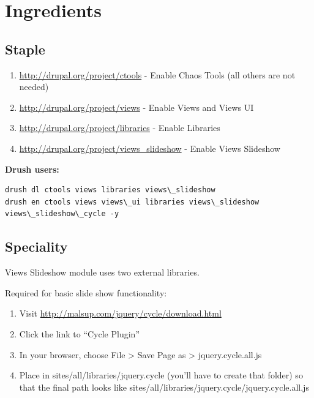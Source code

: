 \documentclass[letterpaper,10pt,english]{sphinxmanual}
\begin{document}
\section{Ingredients}
\label{slides:ingredients}

\subsection{Staple}
\label{slides:staple}\begin{enumerate}
\item {} 
\href{http://drupal.org/project/ctools}{http://drupal.org/project/ctools} - Enable Chaos Tools (all others are not needed)

\item {} 
\href{http://drupal.org/project/views}{http://drupal.org/project/views} - Enable Views and Views UI

\item {} 
\href{http://drupal.org/project/libraries}{http://drupal.org/project/libraries} - Enable Libraries

\item {} 
\href{http://drupal.org/project/views\_slideshow}{http://drupal.org/project/views\_slideshow} - Enable Views Slideshow

\end{enumerate}

\textbf{Drush users:}

\begin{Verbatim}[commandchars=\\\{\}]
drush dl ctools views libraries views\_slideshow
drush en ctools views views\_ui libraries views\_slideshow views\_slideshow\_cycle -y
\end{Verbatim}


\subsection{Speciality}
\label{slides:speciality}
Views Slideshow module uses two external libraries.

Required for basic slide show functionality:
\begin{enumerate}
\item {} 
Visit \href{http://malsup.com/jquery/cycle/download.html}{http://malsup.com/jquery/cycle/download.html}

\item {} 
Click the link to “Cycle Plugin”

\item {} 
In your browser, choose File \textgreater{} Save Page as \textgreater{} jquery.cycle.all.js

\item {} 
Place in sites/all/libraries/jquery.cycle (you'll have to create that folder) so that the final path looks like sites/all/libraries/jquery.cycle/jquery.cycle.all.js

\end{enumerate}
\end{document}
